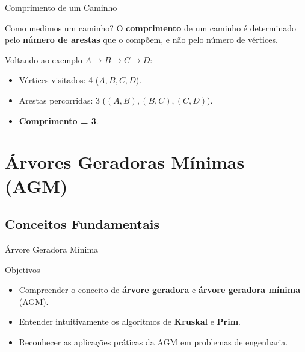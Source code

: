 \documentclass[9pt]{beamer}
\begin{document}
\begin{frame}{Comprimento de um Caminho}
    \begin{block}{Como medimos um caminho?}
        O \textbf{comprimento} de um caminho é determinado pelo \textbf{número de arestas} que o compõem, e não pelo número de vértices.
    \end{block}
    \vspace{0.5cm}
    Voltando ao exemplo $A \rightarrow B \rightarrow C \rightarrow D$:
    \begin{itemize}
        \item Vértices visitados: 4 ($A, B, C, D$).
        \item Arestas percorridas: 3 ($(A,B), (B,C), (C,D)$).
        \item \textbf{Comprimento = 3}.
    \end{itemize}
\end{frame}


\section{Árvores Geradoras Mínimas (AGM)}
\subsection{Conceitos Fundamentais}
\begin{frame}{Árvore Geradora Mínima}
    \begin{block}{Objetivos}
        \begin{itemize}
            \item Compreender o conceito de \textbf{árvore geradora} e \textbf{árvore geradora mínima} (AGM).
            \item Entender intuitivamente os algoritmos de \textbf{Kruskal} e \textbf{Prim}.
            \item Reconhecer as aplicações práticas da AGM em problemas de engenharia.
        \end{itemize}
    \end{block}
\end{frame}
\end{document}
